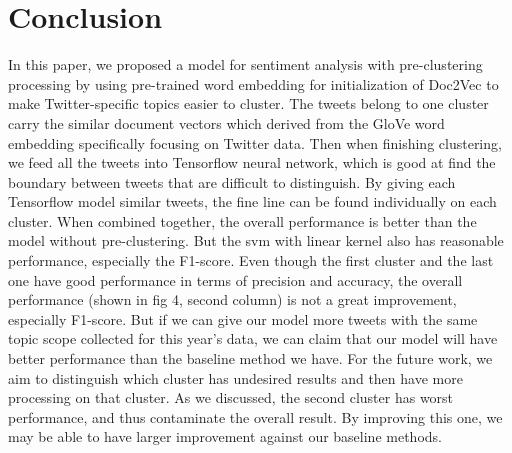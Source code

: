 \documentclass[conference]{IEEEtran}
\begin{document}
\section{Conclusion}
In this paper, we proposed a model for sentiment analysis with pre-clustering processing by using pre-trained word embedding for initialization of Doc2Vec to make Twitter-specific topics easier to cluster. The tweets belong to one cluster carry the similar document vectors which derived from the GloVe word embedding specifically focusing on Twitter data. Then when finishing clustering, we feed all the tweets into Tensorflow neural network, which is good at find the boundary between tweets that are difficult to distinguish. By giving each Tensorflow model similar tweets, the fine line can be found individually on each cluster. When combined together, the overall performance is better than the model without pre-clustering. But the svm with linear kernel also has reasonable performance, especially the F1-score. Even though the first cluster and the last one have good performance in terms of precision and accuracy, the overall performance (shown in fig 4, second column) is not a great improvement, especially F1-score. But if we can give our model more tweets with the same topic scope collected for this year's data, we can claim that our model will have better performance than the baseline method we have. For the future work, we aim to distinguish which cluster has undesired results and then have more processing on that cluster. As we discussed, the second cluster has worst performance, and thus contaminate the overall result. By improving this one, we may be able to have larger improvement against our baseline methods.





%
\end{document}
